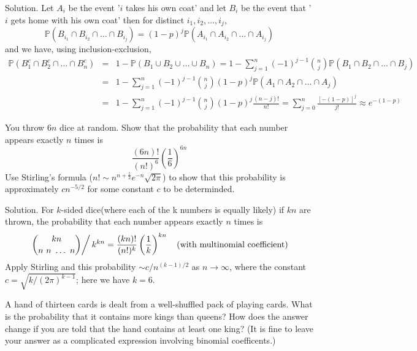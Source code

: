 Solution. Let $A_i$ be the event '$i$ takes his own coat' and let $B_i$ be the event that '$i$ gets home with his own coat' then for distinct $i_1,i_2,\dots,i_j$,
\begin{equation}
\mathbb{P}(B_{i_1}\cap B_{i_2}\cap\dots\cap B_{i_j})=(1-p)^j\mathbb{P}(A_{i_1}\cap A_{i_2}\cap\dots\cap A_{i_j})
\end{equation}
and we have, using inclusion-exclusion,
\begin{eqnarray}
\mathbb{P}(B_1^c\cap B_2^c\cap\dots\cap B_n^c) & = & 1 - \mathbb{P}(B_1\cup B_2\cup\dots\cup B_n) = 1 - \sum^n_{j=1}(-1)^{j-1}\binom{n}{j}\mathbb{P}(B_1\cap B_2\cap\dots\cap B_j) \nonumber\\
& = & 1 - \sum^n_{j=1}(-1)^{j-1}\binom{n}{j}(1-p)^j\mathbb{P}(A_1\cap A_2\cap\dots\cap A_j) \nonumber\\
& = & 1 - \sum^n_{j=1}(-1)^{j-1}\binom{n}{j}(1-p)^j\frac{(n-j)!}{n!} = \sum^n_{j=0}\frac{[-(1-p)]^j}{j!}\approx e^{-(1-p)}
\end{eqnarray}


\item You throw $6n$ dice at random. Show that the probability that each number appears exactly $n$ times is 
\begin{equation}
\frac{(6n)!}{(n!)^6}\left(\frac{1}{6}\right)^{6n}
\end{equation}
Use Stirling's formula ($n!\sim n^{n+\frac{1}{2}}e^{-n}\sqrt{2\pi}$) to show that this probability is approximately $cn^{-5/2}$ for some constant $c$ to be determinded.



Solution. For $k$-sided dice(where each of the k numbers is equally likely) if $kn$ are thrown, the probability that each number appears exactly $n$ times is 
\begin{equation}
\left.\binom{kn}{n\ n\ \dots\ n} \right/k^{kn}= \frac{(kn)!}{(n!)^k}\left(\frac{1}{k}\right)^{kn} \quad (\text{with multinomial coefficient})
\end{equation}
Apply Stirling and this probability $\sim c/n^{(k-1)/2}$ as $n\to\infty$, where the constant $c=\sqrt{k/(2\pi)^{k-1}}$; here we have $k=6$.


\item A hand of thirteen cards is dealt from a well-shuffled pack of playing cards. What is the probability that it contains more kings than queens? How does the answer change if you are told that the hand contains at least one king? (It is fine to leave your answer as a complicated expression involving binomial coefficents.)



